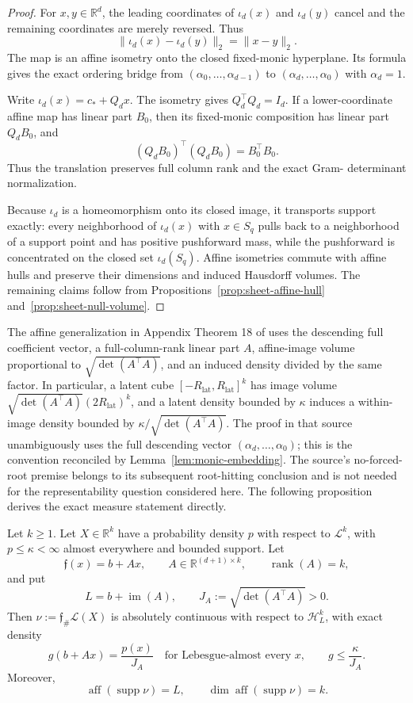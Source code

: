\begin{proof}
For $x,y\in\mathbb R^d$, the leading coordinates of $\iota_d(x)$ and
$\iota_d(y)$ cancel and the remaining coordinates are merely reversed.
Thus
\[
\|\iota_d(x)-\iota_d(y)\|_2=\|x-y\|_2.
\]
The map is an affine isometry onto the closed fixed-monic hyperplane.  Its
formula gives the exact ordering bridge from
$(\alpha_0,\ldots,\alpha_{d-1})$ to
$(\alpha_d,\ldots,\alpha_0)$ with $\alpha_d=1$.

Write $\iota_d(x)=c_*+Q_dx$.  The isometry gives
$Q_d^\top Q_d=I_d$.  If a lower-coordinate affine map has linear part
$B_0$, then its fixed-monic composition has linear part $Q_dB_0$, and
\[
(Q_dB_0)^\top(Q_dB_0)=B_0^\top B_0.
\]
Thus the translation preserves full column rank and the exact Gram-
determinant normalization.

Because $\iota_d$ is a homeomorphism onto its closed image, it transports
support exactly: every neighborhood of $\iota_d(x)$ with $x\in S_q$
pulls back to a neighborhood of a support point and has positive
pushforward mass, while the pushforward is concentrated on the closed set
$\iota_d(S_q)$.  Affine isometries commute with affine hulls and preserve
their dimensions and induced Hausdorff volumes.  The remaining claims
follow from Propositions~\ref{prop:sheet-affine-hull}
and~\ref{prop:sheet-null-volume}.
\end{proof}

The affine generalization in Appendix Theorem 18 of
\citet{balcan2020semibandit} uses the descending full coefficient vector,
a full-column-rank linear part $A$, affine-image volume proportional to
$\sqrt{\det(A^\top A)}$, and an induced density divided by the same
factor.  In particular, a latent cube $[-R_{\mathrm{lat}},R_{\mathrm{lat}}]^k$
has image volume
$\sqrt{\det(A^\top A)}(2R_{\mathrm{lat}})^k$, and a latent density bounded
by $\kappa$ induces a within-image density bounded by
$\kappa/\sqrt{\det(A^\top A)}$.  The proof in that source unambiguously
uses the full descending vector $(\alpha_d,\ldots,\alpha_0)$; this is the
convention reconciled by Lemma~\ref{lem:monic-embedding}.  The source's
no-forced-root premise belongs to its subsequent root-hitting conclusion
and is not needed for the representability question considered here.  The
following proposition derives the exact measure statement directly.

\begin{proposition}
\label{prop:affine-pushforward}
Let $k\geq1$.  Let $X\in\mathbb R^k$ have a probability density $p$
with respect to $\mathcal L^k$, with $p\leq\kappa<\infty$ almost
everywhere and bounded support.  Let
\[
\mathfrak f(x)=b+Ax,
\qquad
A\in\mathbb R^{(d+1)\times k},
\qquad
\operatorname{rank}(A)=k,
\]
and put
\[
L=b+\operatorname{im}(A),
\qquad
J_A:=\sqrt{\det(A^\top A)}>0.
\]
Then $\nu:=\mathfrak f_\#\mathcal L(X)$ is absolutely continuous with
respect to $\mathcal H_L^k$, with exact density
\[
g(b+Ax)=\frac{p(x)}{J_A}
\quad\text{for Lebesgue-almost every }x,
\qquad
g\leq\frac{\kappa}{J_A}.
\]
Moreover,
\[
\operatorname{aff}(\operatorname{supp}\nu)=L,
\qquad
\dim\operatorname{aff}(\operatorname{supp}\nu)=k.
\]
\end{proposition}

